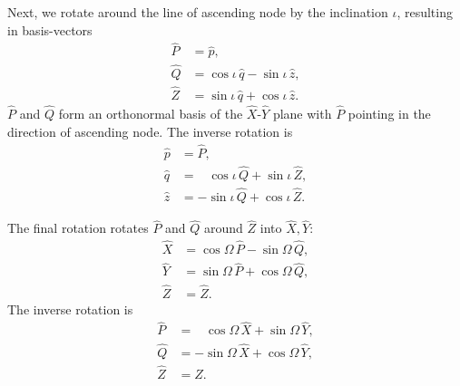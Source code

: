 \documentclass[aps,prd,amssymb,amsmath,amsfonts,superscriptaddress,
floatfix ,preprintnumbers,altaffilletter]{revtex4}
\newcommand{\EzS}{{{\hat z}}}
\newcommand{\ExW}{\hat X}
\newcommand{\EyW}{\hat Y}
\newcommand{\EzW}{\hat Z}
\begin{document}
Next, we rotate around the line of ascending node by the inclination $\iota$,
resulting in basis-vectors
\begin{subequations}
  \label{eq:iota-Rotation1}
\begin{align}
  \hat P&=\hat p,\\
  \hat Q&=\cos\iota\,\hat q - \sin\iota\,\EzS,\\
  \hat Z&=\sin\iota\,\hat q+\cos\iota\,\EzS.
\end{align}
\end{subequations}
 $\hat P$ and $\hat Q$ form an orthonormal basis of the $\ExW$-$\EyW$
plane with $\hat P$ pointing in the direction of ascending node.
The inverse rotation is
\begin{subequations}
  \label{eq:iota-Rotation2}
\begin{align}
  \hat p&=\hat P,\\
  \hat q&=\;\;\;\cos\iota\,\hat Q + \sin\iota\,\EzW,\\
  \EzS &=-\sin\iota\,\hat Q+\cos\iota\,\EzW.
\end{align}
\end{subequations}


The final rotation rotates $\hat P$ and $\hat Q$
around $\EzW$ into $\ExW,\EyW$:
\begin{subequations}
  \label{eq:Omega-Rotation1}
\begin{align}
  \ExW&=\cos\Omega\,\hat P-\sin\Omega\,\hat Q,\\
  \EyW&=\sin\Omega\,\hat P+\cos\Omega\,\hat Q,\\
  \EzW&=\EzW.
\end{align}
\end{subequations}
The inverse rotation is
\begin{subequations}
  \label{eq:Omega-Rotation2}
\begin{align}
  \hat P&=\;\;\;\cos\Omega\,\ExW+\sin\Omega\,\EyW,\\
  \hat Q&=-\sin\Omega\,\ExW+\cos\Omega\,\EyW,\\
  \EzW&=\EzW.
\end{align}
\end{subequations}
\end{document}
